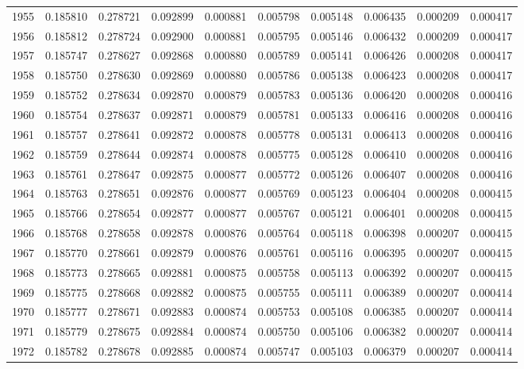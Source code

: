 \begin{tabular}{lrrrrrrrrr}
1955 & 0.185810 & 0.278721 & 0.092899 & 0.000881 & 0.005798 & 0.005148 & 0.006435 & 0.000209 & 0.000417 \\
1956 & 0.185812 & 0.278724 & 0.092900 & 0.000881 & 0.005795 & 0.005146 & 0.006432 & 0.000209 & 0.000417 \\
1957 & 0.185747 & 0.278627 & 0.092868 & 0.000880 & 0.005789 & 0.005141 & 0.006426 & 0.000208 & 0.000417 \\
1958 & 0.185750 & 0.278630 & 0.092869 & 0.000880 & 0.005786 & 0.005138 & 0.006423 & 0.000208 & 0.000417 \\
1959 & 0.185752 & 0.278634 & 0.092870 & 0.000879 & 0.005783 & 0.005136 & 0.006420 & 0.000208 & 0.000416 \\
1960 & 0.185754 & 0.278637 & 0.092871 & 0.000879 & 0.005781 & 0.005133 & 0.006416 & 0.000208 & 0.000416 \\
1961 & 0.185757 & 0.278641 & 0.092872 & 0.000878 & 0.005778 & 0.005131 & 0.006413 & 0.000208 & 0.000416 \\
1962 & 0.185759 & 0.278644 & 0.092874 & 0.000878 & 0.005775 & 0.005128 & 0.006410 & 0.000208 & 0.000416 \\
1963 & 0.185761 & 0.278647 & 0.092875 & 0.000877 & 0.005772 & 0.005126 & 0.006407 & 0.000208 & 0.000416 \\
1964 & 0.185763 & 0.278651 & 0.092876 & 0.000877 & 0.005769 & 0.005123 & 0.006404 & 0.000208 & 0.000415 \\
1965 & 0.185766 & 0.278654 & 0.092877 & 0.000877 & 0.005767 & 0.005121 & 0.006401 & 0.000208 & 0.000415 \\
1966 & 0.185768 & 0.278658 & 0.092878 & 0.000876 & 0.005764 & 0.005118 & 0.006398 & 0.000207 & 0.000415 \\
1967 & 0.185770 & 0.278661 & 0.092879 & 0.000876 & 0.005761 & 0.005116 & 0.006395 & 0.000207 & 0.000415 \\
1968 & 0.185773 & 0.278665 & 0.092881 & 0.000875 & 0.005758 & 0.005113 & 0.006392 & 0.000207 & 0.000415 \\
1969 & 0.185775 & 0.278668 & 0.092882 & 0.000875 & 0.005755 & 0.005111 & 0.006389 & 0.000207 & 0.000414 \\
1970 & 0.185777 & 0.278671 & 0.092883 & 0.000874 & 0.005753 & 0.005108 & 0.006385 & 0.000207 & 0.000414 \\
1971 & 0.185779 & 0.278675 & 0.092884 & 0.000874 & 0.005750 & 0.005106 & 0.006382 & 0.000207 & 0.000414 \\
1972 & 0.185782 & 0.278678 & 0.092885 & 0.000874 & 0.005747 & 0.005103 & 0.006379 & 0.000207 & 0.000414 \\

\end{tabular}

